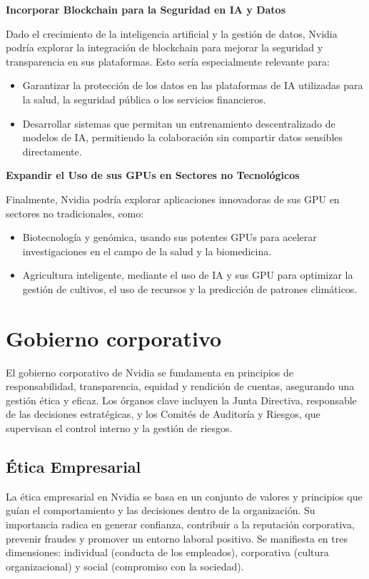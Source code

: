 \documentclass{article}
\begin{document}
\textbf{Incorporar Blockchain para la Seguridad en IA y Datos}

Dado el crecimiento de la inteligencia artificial y la gestión de datos, Nvidia podría explorar la integración de blockchain para mejorar la seguridad y transparencia en sus plataformas. Esto sería especialmente relevante para:
\begin{itemize}
  \item Garantizar la protección de los datos en las plataformas de IA utilizadas para la salud, la seguridad pública o los servicios financieros.
  \item Desarrollar sistemas que permitan un entrenamiento descentralizado de modelos de IA, permitiendo la colaboración sin compartir datos sensibles directamente.
\end{itemize}

\textbf{Expandir el Uso de sus GPUs en Sectores no Tecnológicos}

Finalmente, Nvidia podría explorar aplicaciones innovadoras de sus GPU en sectores no tradicionales, como:
\begin{itemize}
  \item Biotecnología y genómica, usando sus potentes GPUs para acelerar investigaciones en el campo de la salud y la biomedicina.
  \item Agricultura inteligente, mediante el uso de IA y sus GPU para optimizar la gestión de cultivos, el uso de recursos y la predicción de patrones climáticos.
\end{itemize}

\section{Gobierno corporativo}
El gobierno corporativo de Nvidia se fundamenta en principios de responsabilidad, transparencia, equidad y rendición de cuentas, asegurando una gestión ética y eficaz. Los órganos clave incluyen la Junta Directiva, responsable de las decisiones estratégicas, y los Comités de Auditoría y Riesgos, que supervisan el control interno y la gestión de riesgos.

\subsection{Ética Empresarial}

La ética empresarial en Nvidia se basa en un conjunto de valores y principios que guían el comportamiento y las decisiones dentro de la organización. Su importancia radica en generar confianza, contribuir a la reputación corporativa, prevenir fraudes y promover un entorno laboral positivo. Se manifiesta en tres dimensiones: individual (conducta de los empleados), corporativa (cultura organizacional) y social (compromiso con la sociedad).
\end{document}
